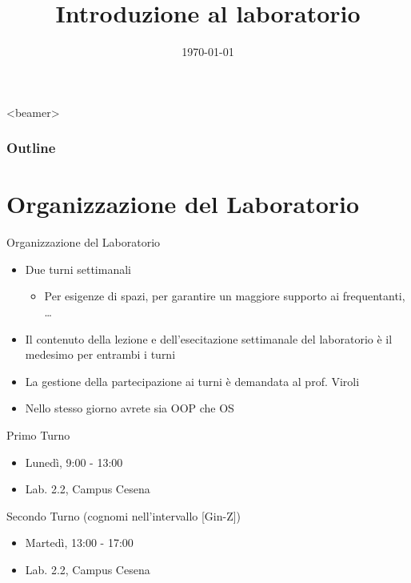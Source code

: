 \documentclass[presentation]{beamer}
\title[{\lab} -- Introduzione]{Introduzione al laboratorio}
\date[\today]{\today}
\begin{document}
\frame[label=coverpage]{\titlepage}

\begin{frame}<beamer>
	\frametitle{Outline}
	\tableofcontents[]
\end{frame}

\section{Organizzazione del Laboratorio}\label{sec:organizzazione-del-laboratorio}

\begin{frame}{Organizzazione del Laboratorio}
    \begin{itemize}
        \item Due turni settimanali
        \begin{itemize}
            \item Per esigenze di spazi, per garantire un maggiore supporto ai frequentanti, \dots
        \end{itemize}
        \item Il contenuto della lezione e dell'esecitazione settimanale del laboratorio è il medesimo per entrambi i turni
        \item La gestione della partecipazione ai turni è demandata al prof. Viroli
        \item Nello stesso giorno avrete sia OOP che OS
    \end{itemize}
    \begin{block}{Primo Turno}
        \begin{itemize}
            \item Lunedì, 9:00 - 13:00
            \item Lab. 2.2, Campus Cesena
        \end{itemize}
    \end{block}
    \begin{block}{Secondo Turno (cognomi nell'intervallo [Gin-Z])}
        \begin{itemize}
            \item Martedì, 13:00 - 17:00
            \item Lab. 2.2, Campus Cesena
        \end{itemize}
    \end{block}
\end{frame}
\end{document}

